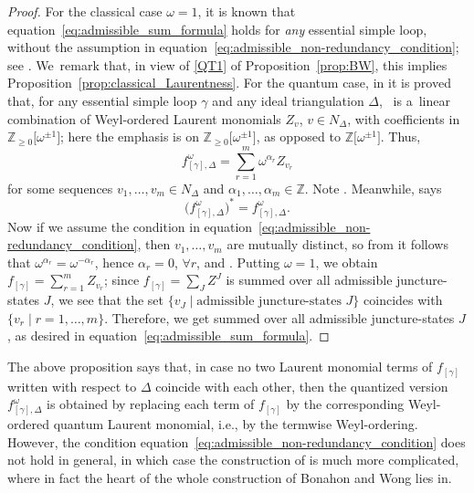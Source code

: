 \documentclass[pdftex]{sigma}
\numberwithin{equation}{section}
\theoremstyle{definition}
\begin{document}
\begin{proof}
For the classical case $\omega=1$, it is known that equation~\eqref{eq:admissible_sum_formula} holds for {\it any} essential simple loop, without the assumption in equation~\eqref{eq:admissible_non-redundancy_condition}; see \cite[Lemma~4, and Section~6 with $\omega=1$]{BW}. We~remark that, in view of \ref{QT1} of Proposition~\ref{prop:BW}, this implies Proposition~\ref{prop:classical_Laurentness}. For the quantum case, in \cite{CKKO} it is proved that, for any essential simple loop $\gamma$ and any ideal triangulation $\Delta$, ~is a~linear combination of Weyl-ordered Laurent monomials $Z_v$, $v\in N_\Delta$, with coefficients in $\mathbb{Z}_{\ge 0}\bigl[\omega^{\pm 1}\bigr]$; here the emphasis is on $\mathbb{Z}_{\ge 0}\bigl[\omega^{\pm 1}\bigr]$, as opposed to $\mathbb{Z}\bigl[\omega^{\pm 1}\bigr]$. Thus,
\[
f^\omega_{[\gamma],\Delta} = \sum_{r=1}^m \omega^{\alpha_r} Z_{v_r}
\]
 for some sequences $v_1,\dots,v_m \in N_\Delta$ and $\alpha_1,\dots,\alpha_m \in \mathbb{Z}$. Note . Meanwhile, \cite[Lemma~2.30]{AK} says
\[
\bigl(f^\omega_{[\gamma],\Delta}\bigr)^* = f^\omega_{[\gamma],\Delta}.
\]
Now if we assume the condition in equation~\eqref{eq:admissible_non-redundancy_condition}, then $v_1,\dots,v_m$ are mutually distinct, so from  it follows that $\omega^{\alpha_r} = \omega^{-\alpha_r}$, hence $\alpha_r=0$, $\forall r$, and . Putting $\omega=1$, we obtain $f_{[\gamma]} = \sum_{r=1}^m Z_{v_r}$; since $f_{[\gamma]} = \sum_J Z^J$ is summed over all admissible juncture-states $J$, we see that the set $\{v_J \mid \mbox{admissible juncture-states $J$}\}$ coincides with $\{ v_r \mid r=1,\dots,m\}$. Therefore, we get  summed over all admissible juncture-states $J$, as desired in equation~\eqref{eq:admissible_sum_formula}.
\end{proof}
The above proposition says that, in case no two Laurent monomial terms of $f_{[\gamma]}$ written with respect to $\Delta$ coincide with each other, then the quantized version $f^\omega_{[\gamma],\Delta}$ is obtained by replacing each term of $f_{[\gamma]}$ by the corresponding Weyl-ordered quantum Laurent monomial, i.e., by the termwise Weyl-ordering. However, the condition equation~\eqref{eq:admissible_non-redundancy_condition} does not hold in general, in which case the construction of  is much more complicated, where in fact the heart of the whole construction of Bonahon and Wong \cite{BW} lies in.
\end{document}
